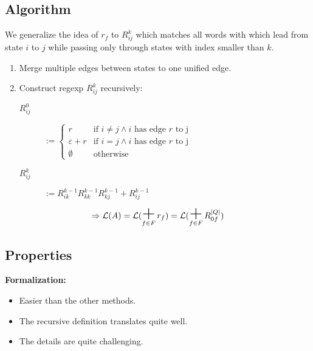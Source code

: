 \documentclass{beamer}
\DeclareMathOperator*{\bigplus}{\mbox{\huge +}}
\begin{document}
\subsection*{Algorithm}
\begin{frame}

    We generalize the idea of $r_f$ to $R^k_{i j}$ which matches all words with which lead from state $i$ to $j$ while passing only through states with index smaller than $k$.

    \begin{enumerate}
        \item 
            Merge multiple edges between states to one unified edge.
        \item
            Construct regexp $R^k_{i j}$ recursively:

            \begin{description}

                \item[$R^0_{i j}$]
                    $ := \begin{cases} 
                        r & \mbox{if } i \neq j \wedge i \mbox{ has edge } r \mbox{ to j}  \\
          \varepsilon + r & \mbox{if } i = j \wedge i \mbox{ has edge } r \mbox{ to j}  \\
                \emptyset & \mbox{otherwise}
                    \end{cases}
                    $ 

                \item[$R^k_{i j}$]
                    $ := R^{k-1}_{i k} R^{k-1}_{k k} R^{k-1}_{k j} + R^{k-1}_{i j}$

            \end{description}

    \end{enumerate}

    \[ 
        \Rightarrow \mathcal{L}(A) = \mathcal{L}(\bigplus_{f \in F} r_f) = \mathcal{L}(\bigplus_{f \in F} R^{|Q|}_{0 f}) 
    \]

\end{frame}

\subsection*{Properties}
\begin{frame}
    \textbf{Formalization:} \\
    \begin{itemize}
        \item
            Easier than the other methods.\\
        \item
            The recursive definition translates quite well.\\
        \item
            The details are quite challenging.
    \end{itemize} 
\end{frame}
\end{document}
